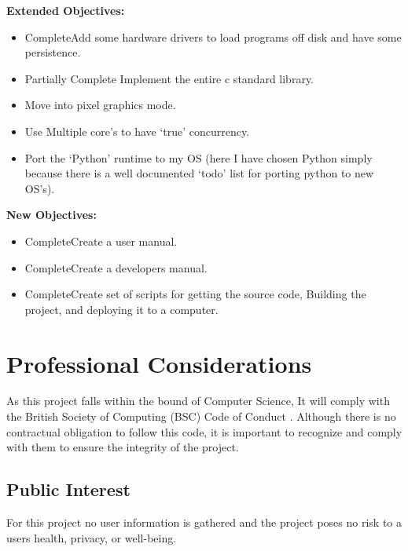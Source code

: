 \documentclass[a4paper]{report}
\begin{document}
\textbf {Extended Objectives:}


\begin{itemize}
\item \lbrack Complete\rbrack Add some hardware drivers to load programs off disk and have some persistence.
\item \lbrack Partially Complete \rbrack Implement the entire c standard library.
\item Move into pixel graphics mode.
\item Use Multiple core's to have `true' concurrency.
\item Port the `Python' runtime to my OS (here I have chosen Python simply because there is a well documented `todo' list for porting python to new OS's).
\end{itemize}

\textbf {New Objectives:}


\begin{itemize}
\item \lbrack Complete\rbrack Create a user manual.
\item \lbrack Complete\rbrack Create a developers manual.
\item \lbrack Complete\rbrack Create set of scripts for getting the source code, Building the project, and deploying it to a computer.
\end{itemize}















\chapter{Professional Considerations}

As this project falls within the bound of Computer Science, It will comply with the British Society of Computing (BSC) Code of Conduct \cite{CoC}. Although there is no contractual obligation to follow this code, it is important to recognize and comply with them to ensure the integrity of the project.

\section{Public Interest}

For this project no user information is gathered and the project poses no risk to a users health, privacy, or well-being.
\end{document}
